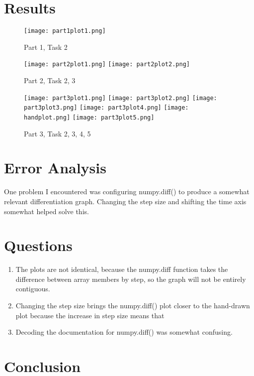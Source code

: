 \documentclass[11pt,a4]{article}
\begin{document}
\section{Results}
\begin{figure}[H]
	\centering
	\texttt{[image: part1plot1.png]}
	\caption{Part 1, Task 2}
\end{figure}
\begin{figure}[H]
	\centering
	\texttt{[image: part2plot1.png]}
	\texttt{[image: part2plot2.png]}
	\caption{Part 2, Task 2, 3}
\end{figure}
\begin{figure}[H]
	\centering
	\texttt{[image: part3plot1.png]}
	\texttt{[image: part3plot2.png]}
	\texttt{[image: part3plot3.png]}
	\texttt{[image: part3plot4.png]}
	\texttt{[image: handplot.png]}
	\texttt{[image: part3plot5.png]}
	\caption{Part 3, Task 2, 3, 4, 5}
\end{figure}

\section{Error Analysis}
One problem I encountered was configuring numpy.diff() to produce a somewhat relevant differentiation graph. Changing the step size and shifting the time axis somewhat helped solve this.

\section{Questions}
\begin{enumerate}
	\item The plots are not identical, because the numpy.diff function takes the difference between array members by step, so the graph will not be entirely contiguous.
	\item Changing the step size brings the numpy.diff() plot closer to the hand-drawn plot because the increase in step size means that 
	\item Decoding the documentation for numpy.diff() was somewhat confusing.
\end{enumerate}
\section{Conclusion}
\end{document}
